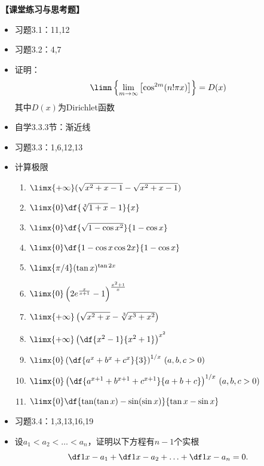 {\bf 【课堂练习与思考题】}
\begin{itemize}
  \item 习题3.1：11,12
  \item 习题3.2：4,7
  \item 证明：$$\limn\left\{\lim\limits_{m\to\infty}\left[\cos^{2m}(n!\pi
	x)\right]\right\}=D(x)$$
	其中$D(x)$为Dirichlet函数
  \item 自学3.3.3节：渐近线 
  \item 习题3.3：1,6,12,13
  \item  计算极限
	\begin{enumerate}[(1)]
	  \item $\limx{+\infty}(\sqrt{x^2+x-1}-\sqrt{x^2+x-1})$ 
	  \item $\limx{0}\df{\sqrt[3]{1+x}-1}{x}$ 
	  \item $\limx{0}\df{\sqrt{1-\cos x^2}}{1-\cos x}$ 
	  \item $\limx{0}\df{1-\cos x\cos 2x}{1-\cos x}$
	  \item $\limx{\pi /4}(\tan x)^{\tan 2x}$ 
	  \item $\limx{0}\left(2e^{\frac{x}{x+1}}-1\right)^{\frac{x^2+1}{x}}$ 
	  \item $\limx{+\infty}\left(\sqrt{x^2+x}-\sqrt[3]{x^3+x^2}\right)$ 
	  \item $\limx{+\infty}\left(\df{x^2-1}{x^2+1}\right)^{x^2}$
	  \item $\limx{0}\left(\df{a^x+b^x+c^x}{3}\right)^{1/x}\,(a,b,c>0)$ 
	  \item $\limx{0}\left(\df{a^{x+1}+b^{x+1}+c^{x+1}}{a+b+c}\right)^{1/x}
	  \,(a,b,c>0)$ 
	  \item $\limx{0}\df{\tan(\tan x)-\sin(\sin x)}{\tan x-\sin x}$
	\end{enumerate}
  \item 习题3.4：1,3,13,16,19
  \item 设$a_1<a_2<\ldots<a_n$，证明以下方程有$n-1$个实根
	$$\df 1{x-a_1}+\df 1{x-a_2}+\ldots+\df 1{x-a_n}=0.$$
\end{itemize}